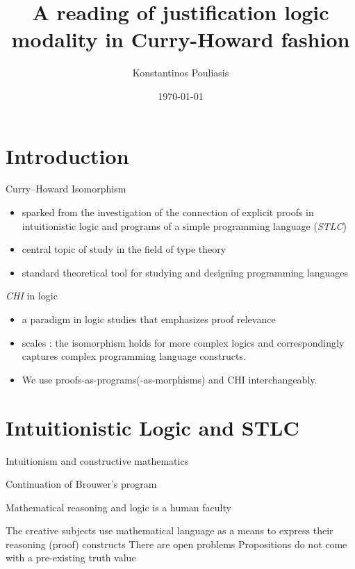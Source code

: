 \documentclass{beamer}
\title{A reading of justification logic modality in Curry-Howard fashion}
\date{\today}
\author{Konstantinos Pouliasis}
\institute{CUNY, Graduate Center}
\begin{document}
    \maketitle
    \section{Introduction}
    \begin{frame}{Curry--Howard Isomorphism}
      \begin{itemize}
\item sparked from the investigation of the connection of 
explicit proofs in intuitionistic logic and 
programs of a simple programming language (\emph{STLC})

\item central topic of study in the field of type theory

\item standard theoretical tool for studying and designing programming languages
      \end{itemize}
\end{frame}
\begin{frame}{\emph{CHI} in logic}
  \begin{itemize}

  \item a  paradigm in logic studies that emphasizes proof relevance

  \item scales : the isomorphism holds for more complex logics and correspondingly captures complex programming language constructs.

  \item We use proofs-as-programs(-as-morphisms) and CHI interchangeably.
  \end{itemize}
\end{frame}
\section{Intuitionistic Logic and STLC}
\begin{frame}{Intuitionism and constructive mathematics}
  \begin{outline}
    \1 {Continuation of Brouwer's program}
    
    
  
  \1 Mathematical reasoning and logic is a human faculty
  
  \2 The creative subjects use mathematical language 
  as a means to express their reasoning (proof) constructs
  \2 
  There are open problems
  \2 
  Propositions do not come with a pre-existing truth value
\end{outline}
\end{frame}
\end{document}
